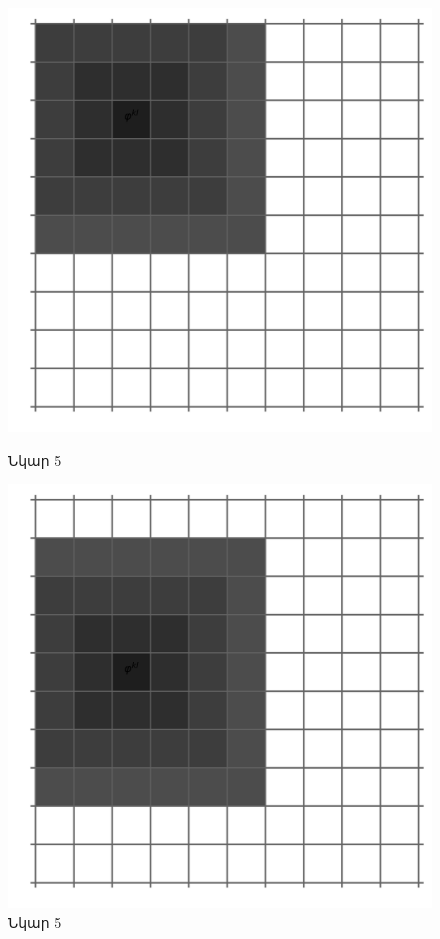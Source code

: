 \documentclass[fleqn, bachelor,subf,12pt,notitlepage]{disser}
\begin{document}
\begin{figure}[h!]
\begin{minipage}[b]{0.2\textwidth}
    \includegraphics[width=\textwidth]{images/two_dimensional_basis_intersection_edge_1}
    \captionsetup{labelformat=empty}
    \caption{Նկար 5}
  \end{minipage}
\hfill
  \begin{minipage}[b]{0.2\textwidth}
    \includegraphics[width=\textwidth]{images/two_dimensional_basis_intersection_edge_2}
    \captionsetup{labelformat=empty}
    \caption{Նկար 5}
  \end{minipage}

\end{figure}
\end{document}
